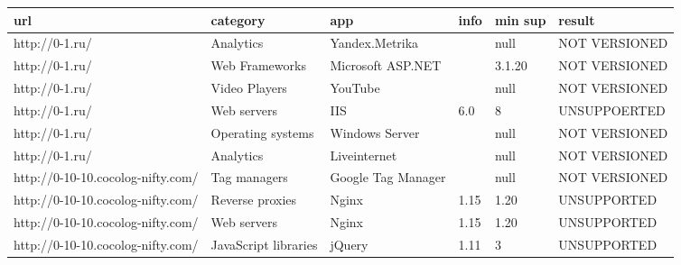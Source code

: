 \begin{adjustwidth}{-2.5 cm}{-2.5 cm}\centering\begin{threeparttable}[!htb]
		\begin{tabular}{|p{2cm}|l|l|l|l|l|}
			\hline
			\textbf{url} & \textbf{category} & \textbf{app} & \textbf{info}  & \textbf{min sup}  & \textbf{result}\\
			\hline
			http://0-1.ru/ & Analytics & Yandex.Metrika & & null & NOT VERSIONED\\
			\hline
			http://0-1.ru/ & Web Frameworks & Microsoft ASP.NET
			& & 3.1.20 & NOT VERSIONED\\
			\hline
			http://0-1.ru/ & Video Players & YouTube & & null & NOT VERSIONED\\
			\hline
			http://0-1.ru/ & Web servers & IIS & 6.0 & 8 &  UNSUPPOERTED\\
			\hline
			http://0-1.ru/ & Operating systems & Windows Server & & null & NOT VERSIONED\\
			\hline
			http://0-1.ru/ & Analytics & Liveinternet & & null & NOT VERSIONED\\
			\hline
			http://0-10-10.cocolog-nifty.com/
			& Tag managers & Google Tag Manager
			& & null & NOT VERSIONED\\
			\hline
			http://0-10-10.cocolog-nifty.com/
			& Reverse proxies
			& Nginx & 1.15 & 1.20 & UNSUPPORTED\\
			\hline
			http://0-10-10.cocolog-nifty.com/
			& Web servers & Nginx & 1.15 & 1.20 &  UNSUPPORTED\\
			\hline
			http://0-10-10.cocolog-nifty.com/
			& JavaScript libraries
			& jQuery & 1.11 & 3 & UNSUPPORTED\\
			\hline
		\end{tabular}
		\label{table:result}
\end{threeparttable}\end{adjustwidth}


